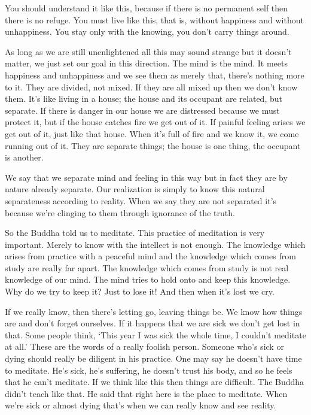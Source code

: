 You should understand it like this, because if there is no permanent self then there is no refuge. You must live like this, that is, without happiness and without unhappiness. You stay only with the knowing, you don't carry things around. 

As long as we are still unenlightened all this may sound strange but it doesn't matter, we just set our goal in this direction. The mind is the mind. It meets happiness and unhappiness and we see them as merely that, there's nothing more to it. They are divided, not mixed. If they are all mixed up then we don't know them. It's like living in a house; the house and its occupant are related, but separate. If there is danger in our house we are distressed because we must protect it, but if the house catches fire we get out of it. If painful feeling arises we get out of it, just like that house. When it's full of fire and we know it, we come running out of it. They are separate things; the house is one thing, the occupant is another. 

We say that we separate mind and feeling in this way but in fact they are by nature already separate. Our realization is simply to know this natural separateness according to reality. When we say they are not separated it's because we're clinging to them through ignorance of the truth. 

So the Buddha told us to meditate. This practice of meditation is very important. Merely to know with the intellect is not enough. The knowledge which arises from practice with a peaceful mind and the knowledge which comes from study are really far apart. The knowledge which comes from study is not real knowledge of our mind. The mind tries to hold onto and keep this knowledge. Why do we try to keep it? Just to lose it! And then when it's lost we cry. 

If we really know, then there's letting go, leaving things be. We know how things are and don't forget ourselves. If it happens that we are sick we don't get lost in that. Some people think, `This year I was sick the whole time, I couldn't meditate at all.' These are the words of a really foolish person. Someone who's sick or dying should really be diligent in his practice. One may say he doesn't have time to meditate. He's sick, he's suffering, he doesn't trust his body, and so he feels that he can't meditate. If we think like this then things are difficult. The Buddha didn't teach like that. He said that right here is the place to meditate. When we're sick or almost dying that's when we can really know and see reality. 

